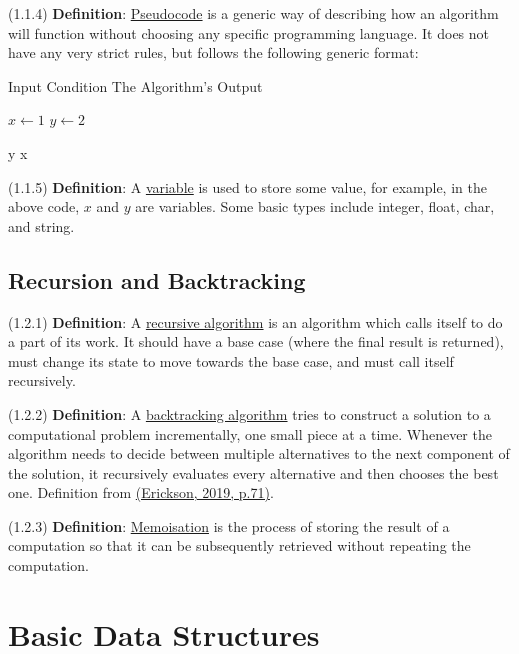 \documentclass{article}
\newcommand{\separate}[1] {\vspace{#1 pt}\noindent}
\newcommand{\definition}[2]{(#1) \textbf{Definition}: #2}
\begin{document}
\separate{5}\definition{1.1.4}{\underline{Pseudocode} is a generic way of describing how an algorithm will function without choosing any specific programming language. It does not have any very strict rules, but follows the following generic format:}
\begin{algorithm}
    \caption{Example Pseducode}
    \begin{algorithmic}
        \Require Input Condition
        \Ensure The Algorithm's Output
        
        \State \(x \gets 1\)
        \State \(y \gets 2\)

            \State \Return y
        \Else
            \State \Return x
        \EndIf
    \end{algorithmic}
\end{algorithm}

\noindent\definition{1.1.5}{A \underline{variable} is used to store some value, for example, in the above code, \(x\) and \(y\) are variables. Some basic types include integer, float, char, and string.}

\subsection{Recursion and Backtracking}

\definition{1.2.1}{A \underline{recursive algorithm} is an algorithm which calls itself to do a part of its work. It should have a base case (where the final result is returned), must change its state to move towards the base case, and must call itself recursively.}

\separate{5}\definition{1.2.2}{A \underline{backtracking algorithm} tries to construct a solution to a computational problem incrementally, one small piece at a time. Whenever the algorithm needs to decide between multiple alternatives to the next component of the solution, it recursively evaluates every alternative and then chooses the best one.} Definition from \hyperref[cit:1.algorithms]{(Erickson, 2019, p.71)}.

\separate{5}\definition{1.2.3}{\underline{Memoisation} is the process of storing the result of a computation so that it can be subsequently retrieved without repeating the computation.}

\newpage\section{Basic Data Structures}
\end{document}

